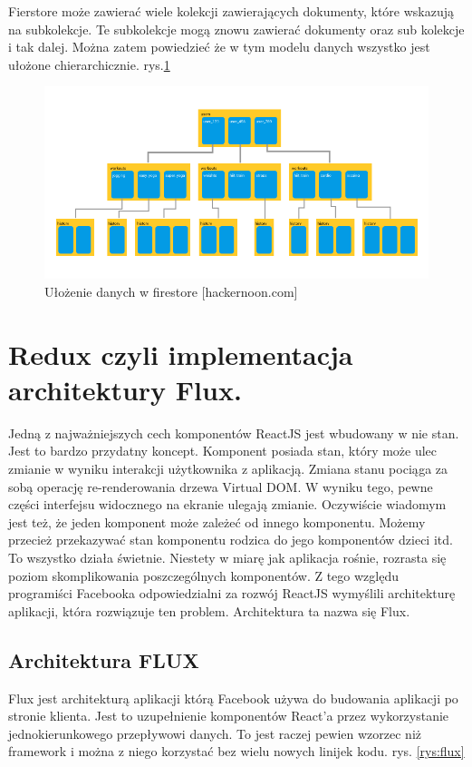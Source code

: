 Fierstore może zawierać wiele kolekcji zawierających dokumenty, które wskazują na subkolekcje. Te subkolekcje mogą znowu zawierać dokumenty oraz sub kolekcje i tak dalej.
Można zatem powiedzieć że w tym modelu danych wszystko jest ułożone chierarchicznie.\cite{www_hakermoon}
rys.\ref{rys:firestoreTree}

\begin{figure}
	\centering\includegraphics[width=.6\textwidth]{img/firestoreTree}
	\caption{Ułożenie danych w firestore [hackernoon.com]}\label{rys:firestoreTree}%
\end{figure}

\section{Redux czyli implementacja architektury Flux.}

Jedną z najważniejszych cech komponentów ReactJS jest wbudowany w nie stan. Jest to bardzo przydatny koncept. Komponent posiada stan, który może ulec zmianie w wyniku interakcji użytkownika z aplikacją. Zmiana stanu pociąga za sobą operację re-renderowania drzewa Virtual DOM. W wyniku tego, pewne części interfejsu widocznego na ekranie ulegają zmianie. Oczywiście wiadomym jest też, że jeden komponent może zależeć od innego komponentu. Możemy przecież przekazywać stan komponentu rodzica do jego komponentów dzieci itd.
To wszystko działa świetnie. Niestety w miarę jak aplikacja rośnie, rozrasta się poziom skomplikowania poszczególnych komponentów. Z tego względu programiści Facebooka odpowiedzialni za rozwój ReactJS wymyślili architekturę aplikacji, która rozwiązuje ten problem. Architektura ta nazwa się Flux.\cite{www_nafrontendzie}

\subsection{Architektura FLUX}

Flux jest architekturą aplikacji którą Facebook używa do budowania aplikacji po stronie klienta. Jest to uzupełnienie komponentów React’a przez wykorzystanie jednokierunkowego przepływowi danych. To jest raczej pewien wzorzec niż framework i można z niego korzystać  bez wielu nowych linijek kodu. rys. \ref{rys:flux}


